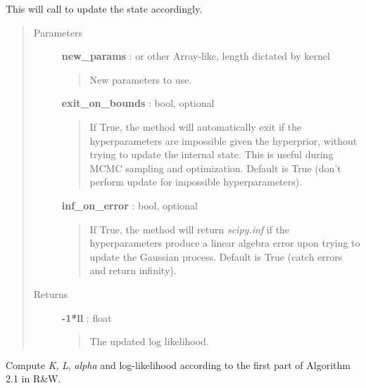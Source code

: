 \documentclass[letterpaper,10pt,english]{sphinxmanual}
\begin{document}
\begin{fulllineitems}
\begin{fulllineitems}
This will call {\hyperref[gptools:gptools.gaussian_process.GaussianProcess.compute_K_L_alpha_ll]{}} to update the state
accordingly.
\begin{quote}\begin{description}
\item[{Parameters}] \leavevmode
\textbf{new\_params} :  or other Array-like, length dictated by kernel
\begin{quote}

New parameters to use.
\end{quote}

\textbf{exit\_on\_bounds} : bool, optional
\begin{quote}

If True, the method will automatically exit if the hyperparameters
are impossible given the hyperprior, without trying to update the
internal state. This is useful during MCMC sampling and optimization.
Default is True (don't perform update for impossible hyperparameters).
\end{quote}

\textbf{inf\_on\_error} : bool, optional
\begin{quote}

If True, the method will return \emph{scipy.inf} if the hyperparameters
produce a linear algebra error upon trying to update the Gaussian
process. Default is True (catch errors and return infinity).
\end{quote}

\item[{Returns}] \leavevmode
\textbf{-1*ll} : float
\begin{quote}

The updated log likelihood.
\end{quote}

\end{description}\end{quote}

\end{fulllineitems}


\begin{fulllineitems}
\label{gptools:gptools.gaussian_process.GaussianProcess.compute_K_L_alpha_ll}
Compute \emph{K}, \emph{L}, \emph{alpha} and log-likelihood according to the first part of Algorithm 2.1 in R\&W.


\end{fulllineitems}
\end{fulllineitems}
\end{document}
